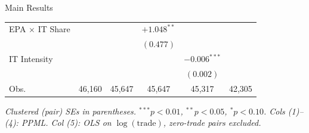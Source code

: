 \documentclass[aspectratio=169,11pt]{beamer}
\begin{document}
\begin{frame}{Main Results}
{\begin{tabular}{lccccc}
        \rowcolor{ufblue!12}
        EPA $\times$ IT Share
          &                &                & $\mathbf{+1.048^{**}}$ &       &   \\
        \rowcolor{ufblue!12}
          &                &                & $(0.477)$      &                &   \\[2pt]
        IT Intensity
          &                &                &                & $-0.006^{***}$ &   \\
          &                &                &                & $(0.002)$      &   \\
        \midrule
        Obs. & 46,160 & 45,647 & 45,647 & 45,317 & 42,305 \\
        \bottomrule
    \end{tabular}}

    \vspace{0.15cm}
    \tiny\textit{Clustered (pair) SEs in parentheses.
    $^{***}p{<}0.01$, $^{**}p{<}0.05$, $^{*}p{<}0.10$.
    Cols (1)--(4): PPML. Col (5): OLS on $\log(\text{trade})$, zero-trade pairs excluded.}

\end{frame}
\end{document}
